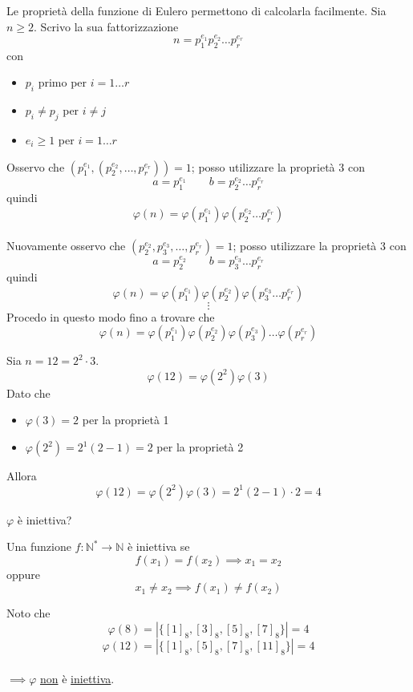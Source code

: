 \documentclass[a4paper,12pt, oneside]{book}
\begin{document}
		Le proprietà della funzione di Eulero permettono di calcolarla facilmente.
		Sia $n \geq 2$. Scrivo la sua fattorizzazione $$n = p_1^{e_1} p_2^{e_2} \dots p_r^{e_r}$$ con \begin{itemize}
			\item $p_i$ primo per $i=1\dots r$
			\item $p_i \not = p_j$ per $i \not = j$
			\item $e_i \geq 1$ per $i = 1 \dots r$
		\end{itemize}
		Osservo che $(p_1^{e_1}, (p_2^{e_2}, \dots, p_r^{e_r})) = 1$; posso utilizzare la proprietà 3 con
		$$a=p_1^{e_1} \qquad b=p_2^{e_2} \dots p_r^{e_r}$$ quindi
		$$\varphi(n) = \varphi(p_1^{e_1})\varphi(p_2^{e_2} \dots p_r^{e_r})$$\\
		Nuovamente osservo che $(p_2^{e_2}, p_3^{e_3}, \dots, p_r^{e_r}) = 1$; posso utilizzare la proprietà 3 con
		$$a=p_2^{e_2} \qquad b=p_3^{e_3} \dots p_r^{e_r}$$ quindi
		$$\varphi(n) = \varphi(p_1^{e_1})\varphi(p_2^{e_2})\varphi(p_3^{e_3} \dots p_r^{e_r})$$
		$$\vdots$$
		Procedo in questo modo fino a trovare che $$\varphi(n) = \varphi(p_1^{e_1})\varphi(p_2^{e_2})\varphi(p_3^{e_3}) \dots \varphi(p_r^{e_r})$$
		
		\begin{esempio}
			Sia $n=12 = 2^2 \cdot 3$.\\
			$$\varphi(12) = \varphi(2^2)\varphi(3)$$
			Dato che \begin{itemize}
				\item $\varphi(3)=2$ per la proprietà 1
				\item $\varphi(2^2)=2^1(2-1) = 2$ per la proprietà 2
			\end{itemize}
			Allora $$\varphi(12) = \varphi(2^2)\varphi(3)=2^1(2-1) \cdot 2 = 4$$
		\end{esempio}

		\begin{osservazione}
			$\varphi$ è iniettiva?
			\begin{shaded}
				\begin{definizione}
					Una funzione $f: \mathbb{N}^* \rightarrow \mathbb{N}$ è iniettiva se
					$$f(x_1)=f(x_2) \implies x_1=x_2$$
					oppure
					$$x_1 \not = x_2 \implies f(x_1) \not = f(x_2)$$
				\end{definizione}
			\end{shaded}
			Noto che
			$$\varphi(8) = |\{ [1]_8, [3]_8, [5]_8, [7]_8 \}| = 4$$
			$$\varphi(12) = |\{ [1]_8, [5]_8, [7]_8, [11]_8 \}| = 4$$\\
			$\implies \varphi$ \underline{non} è \underline{iniettiva}.
		\end{osservazione}
		
\end{document}
